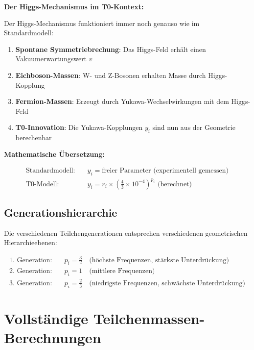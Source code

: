 \documentclass[12pt,a4paper]{article}
\begin{document}
	\textbf{Der Higgs-Mechanismus im T0-Kontext:}
	
	Der Higgs-Mechanismus funktioniert immer noch genauso wie im Standardmodell:
	
	\begin{enumerate}
		\item \textbf{Spontane Symmetriebrechung}: Das Higgs-Feld erhält einen Vakuumerwartungswert $v$
		\item \textbf{Eichboson-Massen}: W- und Z-Bosonen erhalten Masse durch Higgs-Kopplung
		\item \textbf{Fermion-Massen}: Erzeugt durch Yukawa-Wechselwirkungen mit dem Higgs-Feld
		\item \textbf{T0-Innovation}: Die Yukawa-Kopplungen $y_i$ sind nun aus der Geometrie berechenbar
	\end{enumerate}
	
	\textbf{Mathematische Übersetzung:}
	
	\begin{align}
		\text{Standardmodell:} \quad &y_i = \text{freier Parameter (experimentell gemessen)} \\
		\text{T0-Modell:} \quad &y_i = r_i \times \left(\frac{4}{3} \times 10^{-4}\right)^{p_i} \text{ (berechnet)}
	\end{align}
	
	\subsection{Generationshierarchie}
	\label{subsec:generation_hierarchy}
	
	Die verschiedenen Teilchengenerationen entsprechen verschiedenen geometrischen Hierarchieebenen:
	
	\begin{align}
		\text{1. Generation:} \quad &p_i = \frac{3}{2} \quad \text{(höchste Frequenzen, stärkste Unterdrückung)} \\
		\text{2. Generation:} \quad &p_i = 1 \quad \text{(mittlere Frequenzen)} \\
		\text{3. Generation:} \quad &p_i = \frac{2}{3} \quad \text{(niedrigste Frequenzen, schwächste Unterdrückung)}
	\end{align}
	
	\section{Vollständige Teilchenmassen-Berechnungen}
	\label{sec:complete_calculations}
	
\end{document}
